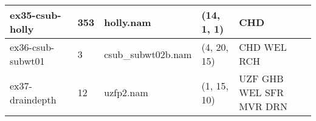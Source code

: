 \begin{longtable}{p{3cm} p{1cm} p{3cm} p{2.5cm}p{4cm}}
\hline
ex35-csub-holly & 353 & \parbox[t]{3cm}{ holly.nam \\}& \parbox[t]{3cm}{ (14, 1, 1) \\}& \parbox[t]{4cm}{ CHD  \\}\\
\hline
ex36-csub-subwt01 & 3 & \parbox[t]{3cm}{ csub\_subwt02b.nam \\}& \parbox[t]{3cm}{ (4, 20, 15) \\}& \parbox[t]{4cm}{ CHD WEL RCH  \\}\\
\hline
ex37-draindepth & 12 & \parbox[t]{3cm}{ uzfp2.nam \\}& \parbox[t]{3cm}{ (1, 15, 10) \\}& \parbox[t]{4cm}{ UZF GHB WEL SFR MVR DRN  \\}\\
\hline
\hline
\end{longtable}
\label{table:examples}
\normalsize

    